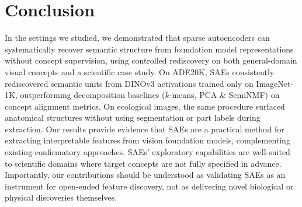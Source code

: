 \documentclass[runningheads]{llncs}
\begin{document}




\section{Conclusion}



In the settings we studied, we demonstrated that sparse autoencoders can systematically recover semantic structure from foundation model representations without concept supervision, using controlled rediscovery on both general-domain visual concepts and a scientific case study.
On ADE20K, SAEs consistently rediscovered semantic units from DINOv3 activations trained only on ImageNet-1K, outperforming decomposition baselines ($k$-means, PCA \& SemiNMF) on concept alignment metrics. 
On ecological images, the same procedure surfaced anatomical structures without using segmentation or part labels during extraction.
Our results provide evidence that SAEs are a practical method for extracting interpretable features from vision foundation models, complementing existing confirmatory approaches.
SAEs' exploratory capabilities are well-suited to scientific domains where target concepts are not fully specified in advance.
Importantly, our contributions should be understood as validating SAEs as an instrument for open-ended feature discovery, not as delivering novel biological or physical discoveries themselves.
\end{document}
